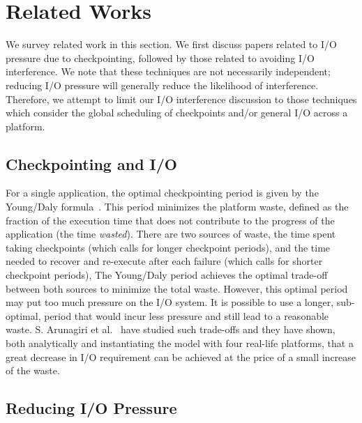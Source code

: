 

\section{Related Works}\label{sec:related}

We survey related work in this section. We first discuss papers related to I/O
pressure due to checkpointing, followed by those related to avoiding I/O
interference.  We note that these techniques are not necessarily independent;
reducing I/O pressure will generally reduce the likelihood of interference.
Therefore, we attempt to limit our I/O interference discussion to those
techniques which consider the global scheduling of checkpoints and/or general
I/O across a platform.


\subsection{Checkpointing and I/O}

For a single application, the optimal checkpointing period is given by the
Young/Daly formula~\cite{young74,daly04}. This period minimizes the platform
waste, defined as the fraction of the execution time that does not contribute
to the progress of the application (the time \emph{wasted}).  There are two
sources of waste, the time spent taking checkpoints (which calls for longer
checkpoint periods), and the time needed to recover and re-execute after each
failure (which calls for shorter checkpoint periods), The Young/Daly period
achieves the optimal trade-off between both sources to minimize the total
waste.  However, this optimal period may put too much pressure on the I/O
system. It is possible to use a longer, sub-optimal, period that would incur
less pressure and still lead to a reasonable waste. S. Arunagiri et
al.~\cite{Arunagiri2009} have studied such trade-offs and they have shown, both
analytically and instantiating the model with four real-life platforms, that a
great decrease in I/O requirement can be achieved  at the price of a small
increase of the waste.

\subsection{Reducing I/O Pressure}

